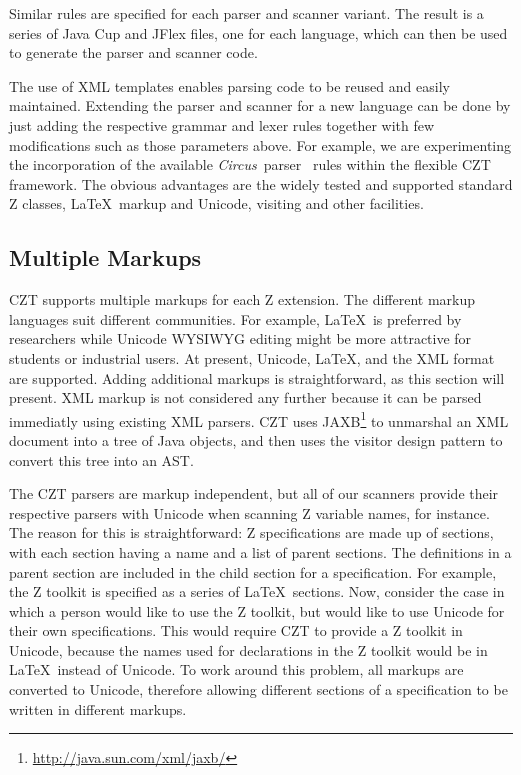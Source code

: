 \documentclass{llncs}
\newcommand{\Circus}{{\sf\slshape Circus}}
\begin{document}
Similar rules are specified for each parser and scanner variant. The
result is a series of Java Cup and JFlex files, one for each language,
which can then be used to generate the parser and scanner code.

The use of XML templates enables parsing code to be reused and easily
maintained.  Extending the parser and scanner for a new language can
be done by just adding the respective grammar and lexer rules together
with few modifications such as those parameters above.  For example,
we are experimenting the incorporation of the available \Circus\
parser~\cite{circus.other:parser} rules within the flexible CZT
framework. The obvious advantages are the widely tested and supported
standard Z classes, \LaTeX\ markup and Unicode, visiting and other
facilities.

\subsection{Multiple Markups}\label{multiple-markups}

 CZT supports multiple markups for each Z extension.  The different
 markup languages suit different communities.  For example, \LaTeX\ is
 preferred by researchers while Unicode WYSIWYG editing might be more
 attractive for students or industrial users. At present, Unicode,
 \LaTeX, and the XML format are supported.  Adding additional markups
 is straightforward, as this section will present.  XML markup is not
 considered any further because it can be parsed immediatly using
 existing XML parsers.  CZT uses
 JAXB\footnote{\url{http://java.sun.com/xml/jaxb/}} to unmarshal an
 XML document into a tree of Java objects, and then uses the visitor
 design pattern to convert this tree into an AST.

The CZT parsers are markup independent, but all of our scanners
provide their respective parsers with Unicode when scanning Z variable
names, for instance. The reason for this is straightforward: Z specifications
are made up of sections, with each section having a name and a list of
parent sections. The definitions in a parent section are included in
the child section for a specification. For example, the Z toolkit is
specified as a series of \LaTeX\ sections. Now, consider the case in
which a person would like to use the Z toolkit, but would like to use
Unicode for their own specifications. This would require CZT to
provide a Z toolkit in Unicode, because the names used for
declarations in the Z toolkit would be in \LaTeX~instead of
Unicode. To work around this problem, all markups are converted to
Unicode, therefore allowing different sections of a specification to
be written in different markups.
\end{document}
